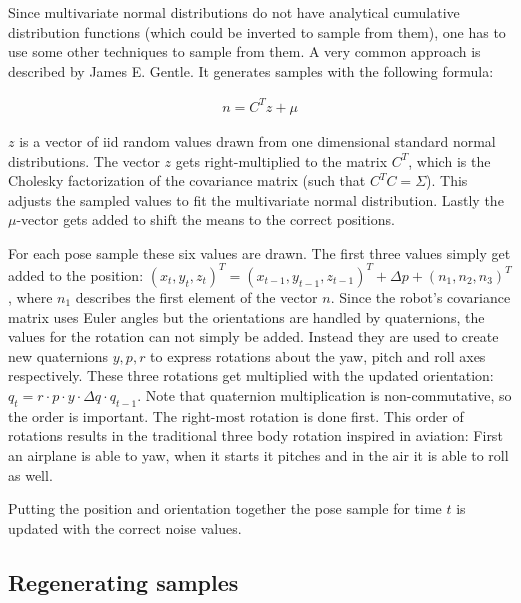 \documentclass[Thesis.tex]{subfiles}
\begin{document}
Since multivariate normal distributions do not have analytical cumulative distribution functions (which could be inverted to sample from them), one has to use some other techniques to sample from them. A very common approach is described by James E. Gentle\cite[p.~197]{Gentle:2005}. It generates samples with the following formula:

\begin{align}
n = C^Tz+\mu %
\end{align}

$z$ is a vector of \gls{iid} random values drawn from one dimensional standard normal distributions. The vector $z$ gets right-multiplied to the matrix $C^T$, which is the Cholesky factorization of the covariance matrix (such that $C^TC = \Sigma$). This adjusts the sampled values to fit the multivariate normal distribution. Lastly the $\mu$-vector gets added to shift the means to the correct positions.

For each pose sample these six values are drawn. The first three values simply get added to the position: $(x_t, y_t, z_t)^T = (x_{t-1}, y_{t-1}, z_{t-1})^T + \Delta p + (n_1, n_2, n_3)^T$, where $n_1$ describes the first element of the vector $n$.
Since the robot's covariance matrix uses Euler angles but the orientations are handled by quaternions, the values for the rotation can not simply be added. Instead they are used to create new quaternions $y, p, r$ to express rotations about the yaw, pitch and roll axes respectively. These three rotations get multiplied with the updated orientation: $q_{t} = r \cdot p \cdot y \cdot \Delta q \cdot q_{t-1}$. Note that quaternion multiplication is non-commutative, so the order is important. The right-most rotation is done first. This order of rotations results in the traditional three body rotation inspired in aviation: First an airplane is able to yaw, when it starts it pitches and in the air it is able to roll as well.

Putting the position and orientation together the pose sample for time $t$ is updated with the correct noise values.

\subsection{Regenerating samples}
\end{document}
